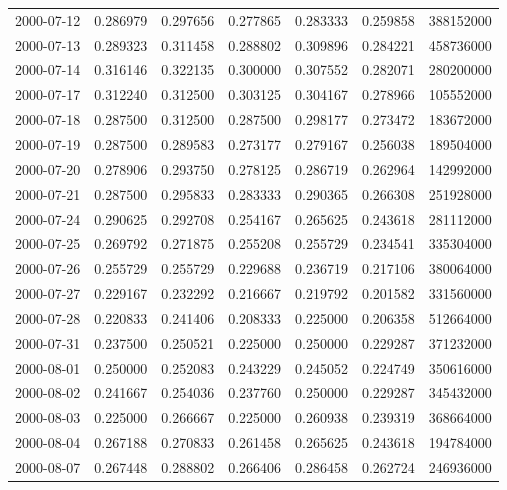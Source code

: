 \begin{tabular}{lrrrrrr}
2000-07-12 &    0.286979 &    0.297656 &    0.277865 &    0.283333 &    0.259858 &   388152000 \\
2000-07-13 &    0.289323 &    0.311458 &    0.288802 &    0.309896 &    0.284221 &   458736000 \\
2000-07-14 &    0.316146 &    0.322135 &    0.300000 &    0.307552 &    0.282071 &   280200000 \\
2000-07-17 &    0.312240 &    0.312500 &    0.303125 &    0.304167 &    0.278966 &   105552000 \\
2000-07-18 &    0.287500 &    0.312500 &    0.287500 &    0.298177 &    0.273472 &   183672000 \\
2000-07-19 &    0.287500 &    0.289583 &    0.273177 &    0.279167 &    0.256038 &   189504000 \\
2000-07-20 &    0.278906 &    0.293750 &    0.278125 &    0.286719 &    0.262964 &   142992000 \\
2000-07-21 &    0.287500 &    0.295833 &    0.283333 &    0.290365 &    0.266308 &   251928000 \\
2000-07-24 &    0.290625 &    0.292708 &    0.254167 &    0.265625 &    0.243618 &   281112000 \\
2000-07-25 &    0.269792 &    0.271875 &    0.255208 &    0.255729 &    0.234541 &   335304000 \\
2000-07-26 &    0.255729 &    0.255729 &    0.229688 &    0.236719 &    0.217106 &   380064000 \\
2000-07-27 &    0.229167 &    0.232292 &    0.216667 &    0.219792 &    0.201582 &   331560000 \\
2000-07-28 &    0.220833 &    0.241406 &    0.208333 &    0.225000 &    0.206358 &   512664000 \\
2000-07-31 &    0.237500 &    0.250521 &    0.225000 &    0.250000 &    0.229287 &   371232000 \\
2000-08-01 &    0.250000 &    0.252083 &    0.243229 &    0.245052 &    0.224749 &   350616000 \\
2000-08-02 &    0.241667 &    0.254036 &    0.237760 &    0.250000 &    0.229287 &   345432000 \\
2000-08-03 &    0.225000 &    0.266667 &    0.225000 &    0.260938 &    0.239319 &   368664000 \\
2000-08-04 &    0.267188 &    0.270833 &    0.261458 &    0.265625 &    0.243618 &   194784000 \\
2000-08-07 &    0.267448 &    0.288802 &    0.266406 &    0.286458 &    0.262724 &   246936000 \\

\end{tabular}
